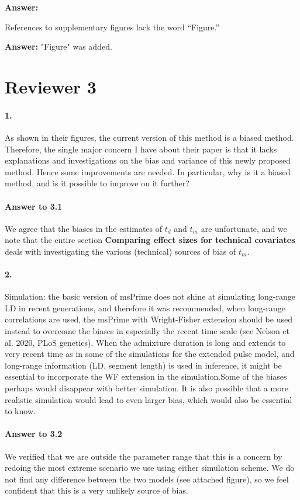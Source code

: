 \documentclass[11pt]{article}
\let\oldparagraph\paragraph
\renewcommand{\paragraph}[1]{\oldparagraph{#1}\mbox{}}
\begin{document}
\textbf{Answer:} 

References to supplementary figures lack the word “Figure.” 

\textbf{Answer:} "Figure" was added.

\section{Reviewer 3}\label{Reviewer 3}

\paragraph{1.}
As shown in their figures, the current version of this method is a biased method. Therefore, the single major concern I have about their paper is that it lacks explanations and investigations on the bias and variance of this newly proposed method. Hence some improvements are needed. In particular, why is it a biased method, and is it possible to improve on it further?

\paragraph{Answer to 3.1}
We agree that the biases in the estimates of $t_d$ and $t_m$ are unfortunate, and we note that the entire section \textbf{Comparing effect sizes for technical covariates} deals with investigating the various (technical) sources of bias of $t_m$. 

\paragraph{2.}
Simulation: the basic version of msPrime does not shine at simulating long-range LD in recent generations, and therefore it was recommended, when long-range correlations are used, the msPrime with Wright-Fisher extension should be used instead to overcome the biases in especially the recent time scale (see Nelson et al. 2020, PLoS genetics). When the admixture duration is long and extends to very recent time as in some of the simulations for the extended pulse model, and long-range information (LD, segment length) is used in inference, it might be essential to incorporate the WF extension in the simulation.Some of the biases perhaps would disappear with better simulation. It is also possible that a more realistic simulation would lead to even larger bias, which would also be essential to know.

\paragraph{Answer to 3.2}
We verified that we are outside the parameter range that this is a concern by redoing the most extreme scenario we use using either simulation scheme. We do not find any difference between the two models (see attached figure), so we feel confident that this is a very unlikely source of bias.
\end{document}
